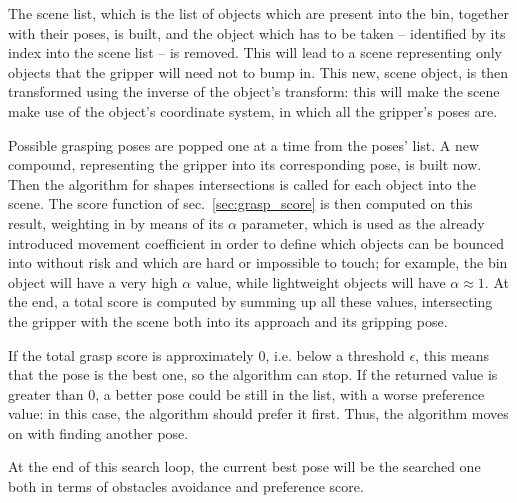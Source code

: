 The scene list, which is the list of objects which are present into
the bin, together with their poses, is built, and the object which has
to be taken -- identified by its index into the scene list -- is
removed. This will lead to a scene representing only objects that
the gripper will need not to bump in. This new, scene object, is then
transformed using the inverse of the object's transform: this will
make the scene make use of the object's coordinate system, in which
all the gripper's poses are.

Possible grasping poses are popped one at a time from the poses'
list. A new compound, representing the gripper into its corresponding
pose, is built now. Then the algorithm for shapes intersections is
called for each object into the scene. The score function of
sec.~\ref{sec:grasp_score} is then computed on this result,
weighting in by means of its $\alpha$ parameter, which is used as the
already introduced movement coefficient in order to define which
objects can be bounced into without risk and which are hard or
impossible to touch; for example, the bin object will have a very high
$\alpha$ value, while lightweight objects will have $\alpha \approx
1$. At the end, a total score is computed by summing up all these
values, intersecting the gripper with the scene both into its approach and its
gripping pose.

If the total grasp score is approximately 0, i.e. below a threshold $\epsilon$, this means that the pose is
the best one, so the algorithm can stop. If the returned value is
greater than 0, a better pose could be still in the list, with a worse
preference value: in this case, the algorithm should prefer it
first. Thus, the algorithm moves on with finding another pose.

At the end of this search loop, the current best pose will be the
searched one both in terms of obstacles avoidance  and preference
score. 

